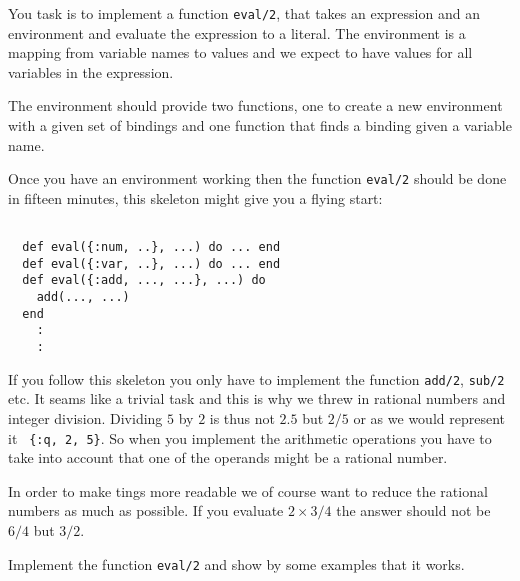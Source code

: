 \documentclass[a4paper,11pt]{article}
\begin{document}
You task is to implement a function {\tt eval/2}, that takes an
expression and an environment and evaluate the expression to a
literal. The environment is a mapping from variable names to values
and we expect to have values for all variables in the expression.

The environment should provide two functions, one to create a new
environment with a given set of bindings and one function that finds
a binding given a variable name. 

Once you have an environment working then the function {\tt eval/2}
should be done in fifteen minutes, this skeleton might give you a
flying start:

\begin{verbatim}

  def eval({:num, ..}, ...) do ... end
  def eval({:var, ..}, ...) do ... end
  def eval({:add, ..., ...}, ...) do
    add(..., ...)
  end
    :
    : 
\end{verbatim}

If you follow this skeleton you only have to implement the function
{\tt add/2}, {\tt sub/2} etc. It seams like a trivial task and this is
why we threw in rational numbers and integer division. Dividing $5$ by
$2$ is thus not $2.5$ but $2/5$ or as we would represent it {\tt
  \{:q, 2, 5\}}. So when you implement the arithmetic operations you
have to take into account that one of the operands might be a rational
number.

In order to make tings more readable we of course want to reduce the
rational numbers as much as possible. If you evaluate $2 \times 3/4$
the answer should not be $6/4$ but $3/2$.

Implement the function {\tt eval/2} and show by some examples that it
works.
\end{document}
